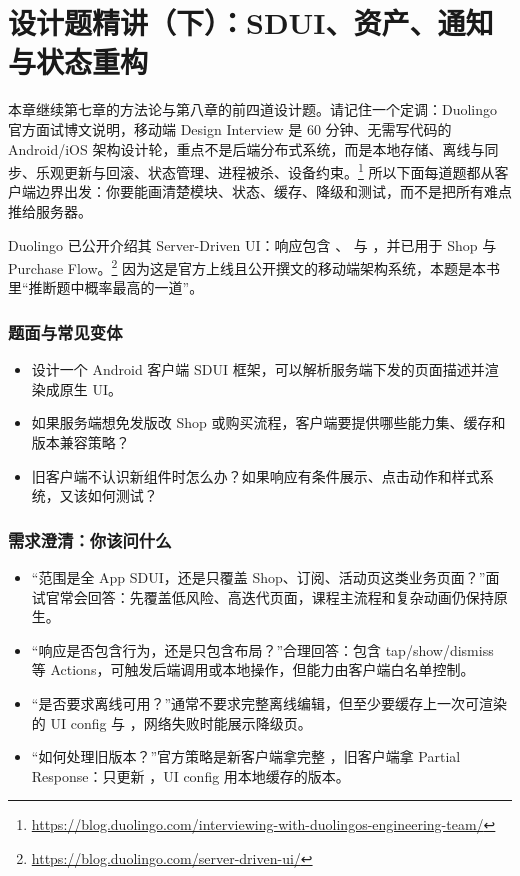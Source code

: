 \chapter{设计题精讲（下）：SDUI、资产、通知与状态重构}

本章继续第七章的方法论与第八章的前四道设计题。请记住一个定调：\srcofficial Duolingo 官方面试博文说明，移动端 Design Interview 是 60 分钟、无需写代码的 Android/iOS 架构设计轮，重点不是后端分布式系统，而是本地存储、离线与同步、乐观更新与回滚、状态管理、进程被杀、设备约束。\footnote{\url{https://blog.duolingo.com/interviewing-with-duolingos-engineering-team/}} 所以下面每道题都从客户端边界出发：你要能画清楚模块、状态、缓存、降级和测试，而不是把所有难点推给服务器。


\srcofficial Duolingo 已公开介绍其 Server-Driven UI：响应包含 、 与 ，并已用于 Shop 与 Purchase Flow。\footnote{\url{https://blog.duolingo.com/server-driven-ui/}} \srcinferred 因为这是官方上线且公开撰文的移动端架构系统，本题是本书里“推断题中概率最高的一道”。

\subsection{题面与常见变体}

\begin{itemize}
  \item 设计一个 Android 客户端 SDUI 框架，可以解析服务端下发的页面描述并渲染成原生 UI。
  \item 如果服务端想免发版改 Shop 或购买流程，客户端要提供哪些能力集、缓存和版本兼容策略？
  \item 旧客户端不认识新组件时怎么办？如果响应有条件展示、点击动作和样式系统，又该如何测试？
\end{itemize}

\subsection{需求澄清：你该问什么}

\begin{itemize}
  \item “范围是全 App SDUI，还是只覆盖 Shop、订阅、活动页这类业务页面？”面试官常会回答：先覆盖低风险、高迭代页面，课程主流程和复杂动画仍保持原生。
  \item “响应是否包含行为，还是只包含布局？”合理回答：包含 tap/show/dismiss 等 Actions，可触发后端调用或本地操作，但能力由客户端白名单控制。
  \item “是否要求离线可用？”通常不要求完整离线编辑，但至少要缓存上一次可渲染的 UI config 与 ，网络失败时能展示降级页。
  \item “如何处理旧版本？”官方策略是新客户端拿完整 ，旧客户端拿 Partial Response：只更新 ，UI config 用本地缓存的版本。\srcofficial
\end{itemize}

